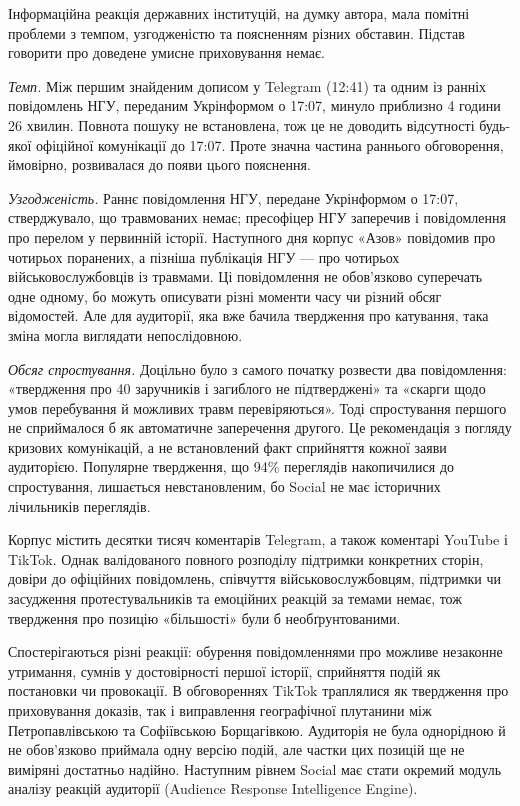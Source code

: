 Інформаційна реакція державних інституцій, на думку автора, мала помітні проблеми з темпом, узгодженістю та поясненням різних обставин. Підстав говорити про доведене умисне приховування немає.

\emph{Темп.} Між першим знайденим дописом у Telegram (12:41) та одним із ранніх повідомлень НГУ, переданим Укрінформом о 17:07, минуло приблизно 4 години 26 хвилин. Повнота пошуку не встановлена, тож це не доводить відсутності будь-якої офіційної комунікації до 17:07. Проте значна частина раннього обговорення, ймовірно, розвивалася до появи цього пояснення.

\emph{Узгодженість.} Раннє повідомлення НГУ, передане Укрінформом о 17:07, стверджувало, що травмованих немає; пресофіцер НГУ заперечив і повідомлення про перелом у первинній історії. Наступного дня корпус «Азов» повідомив про чотирьох поранених, а пізніша публікація НГУ --- про чотирьох військовослужбовців із травмами. Ці повідомлення не обов'язково суперечать одне одному, бо можуть описувати різні моменти часу чи різний обсяг відомостей. Але для аудиторії, яка вже бачила твердження про катування, така зміна могла виглядати непослідовною.

\emph{Обсяг спростування.} Доцільно було з самого початку розвести два повідомлення: «твердження про 40 заручників і загиблого не підтверджені» та «скарги щодо умов перебування й можливих травм перевіряються». Тоді спростування першого не сприймалося б як автоматичне заперечення другого. Це рекомендація з погляду кризових комунікацій, а не встановлений факт сприйняття кожної заяви аудиторією. Популярне твердження, що 94\% переглядів накопичилися до спростування, лишається невстановленим, бо Social не має історичних лічильників переглядів.

Корпус містить десятки тисяч коментарів Telegram, а також коментарі YouTube і TikTok. Однак валідованого повного розподілу підтримки конкретних сторін, довіри до офіційних повідомлень, співчуття військовослужбовцям, підтримки чи засудження протестувальників та емоційних реакцій за темами немає, тож твердження про позицію «більшості» були б необґрунтованими.

Спостерігаються різні реакції: обурення повідомленнями про можливе незаконне утримання, сумнів у достовірності першої історії, сприйняття подій як постановки чи провокації. В обговореннях TikTok траплялися як твердження про приховування доказів, так і виправлення географічної плутанини між Петропавлівською та Софіївською Борщагівкою. Аудиторія не була однорідною й не обов'язково приймала одну версію подій, але частки цих позицій ще не виміряні достатньо надійно. Наступним рівнем Social має стати окремий модуль аналізу реакцій аудиторії (Audience Response Intelligence Engine).

